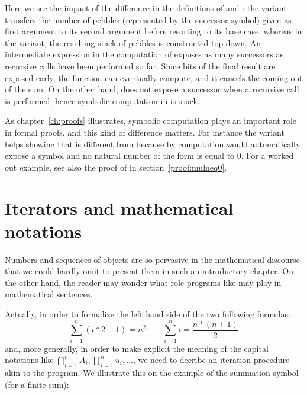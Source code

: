 Here we see the impact of the difference in the definitions of
 and : the  variant transfers the
number of pebbles (represented by the successor  symbol)
given as first argument to its second argument
before resorting to its base case, whereas in the  variant,
the resulting stack of pebbles is constructed top down. An intermediate
expression in the computation of  exposes as many
successors as recursive calls have been performed so far. Since bits
of the final result are exposed early, the  function can
eventually compute, and it cancels the  coming out of the sum.
On the other hand,
 does not expose a successor when a recursive call is
performed; hence symbolic computation in  is stuck.

As chapter~\ref{ch:proofs} illustrates, symbolic computation plays an
important role in formal proofs, and this kind of difference
matters. For instance the  variant helps
showing that  is different from  because by
computation \Coq{} would automatically expose  a  symbol
and no natural number of the form  is equal to 0.
For a worked out example, see also the proof of  in
section~\ref{proof:mulneq0}.


\section{Iterators and mathematical notations}
\label{sec:bigopnat}

Numbers and sequences of objects are so pervasive in the mathematical
discourse that we could hardly omit to present them in such an
introductory chapter. On the other hand, the reader may wonder what role
programs like  may play in mathematical sentences.

Actually, in order to formalize the left hand side of the two
following formulas:
$$
\sum_{i=1}^n (i * 2 - 1) = n ^ 2 \qquad
\sum_{i=1}^n i = \frac{n * (n + 1)}{2}
$$
and, more generally, in order to make explicit the meaning of the capital
notations like $\bigcap_{i=1}^nA_i,
\prod_{i=1}^nu_i, \dots$, we need to decribe an iteration procedure
akin to the  program. We illustrate this on the example of
the summation symbol (for a finite sum):

